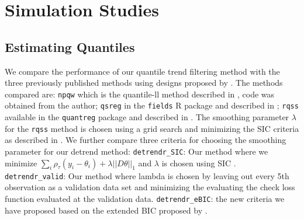 \documentclass[12pt]{article}
\begin{document}
	\section{Simulation Studies}
	
	\subsection{Estimating Quantiles}
	
	We compare the performance of our quantile trend filtering method with the three previously published methods using designs proposed by \cite{Racine2017}. The methods compared are: \texttt{npqw} which is the quantile-ll method described in \cite{Racine2017}, code was obtained from the author; \texttt{qsreg} in the \texttt{fields} R package and described in \cite{Oh2011}; \texttt{rqss} available in the \texttt{quantreg} package and described in \cite{KoenkerNgPortnoy1994}.  The smoothing parameter $\lambda$ for the \texttt{rqss} method is chosen using a grid search and minimizing the SIC criteria as described in \cite{KoenkerNgPortnoy1994}. We further compare three criteria for choosing the smoothing parameter for our detrend method: \texttt{detrendr\_SIC}: Our method where we minimize $\sum_i\rho_{\tau}(y_i - \theta_i) + \lambda||D\theta||_1$ and $\lambda$ is chosen using SIC \citep{KoenkerNgPortnoy1994}.  \texttt{detrendr\_valid}: Our method where lambda is chosen by leaving out every 5th observation as a validation data set and minimizing the evaluating the check loss function evaluated at the validation data. \texttt{detrendr\_eBIC}:  the new criteria we have proposed based on the extended BIC proposed by \cite{chen2008}. 
	 
\end{document}
